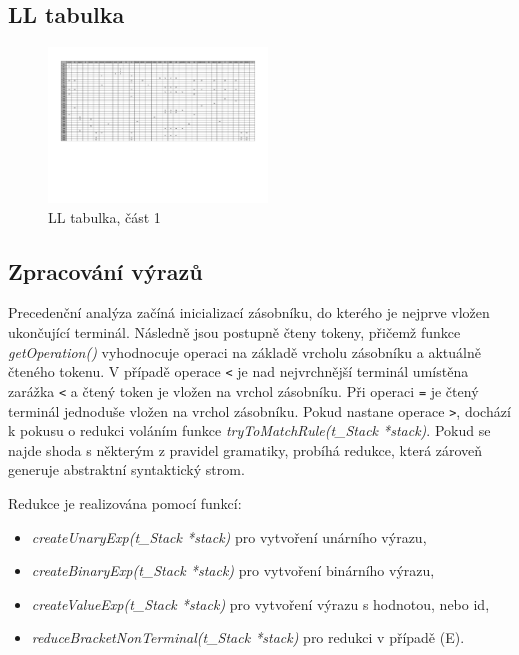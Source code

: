 \documentclass[a4paper, 12pt]{article}
\begin{document}
\newpage

\subsection{LL tabulka}
\begin{figure}[ht!]
\begin{center}
  \includegraphics[angle=90,origin=c, width=0.52\textwidth]{images/LL_table_1.pdf}
  \caption{LL tabulka, část 1}
\end{center}
\end{figure}


\newpage

\subsection{Zpracování výrazů}
Precedenční analýza začíná inicializací zásobníku, do kterého je nejprve vložen ukončující terminál. Následně jsou postupně čteny tokeny, přičemž funkce \textit{getOperation()} vyhodnocuje operaci na základě vrcholu zásobníku a aktuálně čteného tokenu. V případě operace \texttt{<} je nad nejvrchnější terminál umístěna zarážka \texttt{<} a čtený token je vložen na vrchol zásobníku. Při operaci \texttt{=} je čtený terminál jednoduše vložen na vrchol zásobníku. Pokud nastane operace \texttt{>}, dochází k pokusu o redukci voláním funkce \textit{tryToMatchRule(t\_Stack *stack)}. Pokud se najde shoda s některým z pravidel gramatiky, probíhá redukce, která zároveň generuje abstraktní syntaktický strom.

Redukce je realizována pomocí funkcí:
\begin{itemize}
    \item \textit{createUnaryExp(t\_Stack *stack)} pro vytvoření unárního výrazu,
    \item \textit{createBinaryExp(t\_Stack *stack)} pro vytvoření binárního výrazu,
    \item \textit{createValueExp(t\_Stack *stack)} pro vytvoření výrazu s hodnotou, nebo id,
    \item \textit{reduceBracketNonTerminal(t\_Stack *stack)} pro redukci v případě (E).
\end{itemize}
\end{document}
